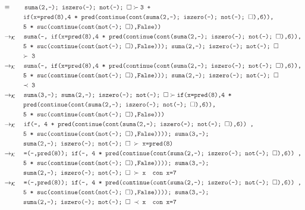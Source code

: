 \documentclass{article}
\newcommand{\tx}[1]{\textcolor{Black} {\texttt{#1}}}
\newcommand{\es}{$\square$}
\newcommand{\pop}[2]{ \tx{#1} \succ \tx{#2}}
\newcommand{\kr}{\rightarrow_{\mathcal{K}} \quad}
\begin{document}
\begin{enumerate}
\begin{enumerate}
\begin{align*}
			& \equiv \quad \quad \pop{suma(2,-); iszero(-); not(-); \es}{3 +}\\
			&\tx{\quad \quad \quad if(x=pred(8),4 * pred(continue(cont(suma(2,-); iszero(-); not(-); \es),6)),}\\
			&\tx{\quad \quad \quad 5 * suc(continue(cont(not(-); \es),False))}\\
			& \kr \tx{suma(-, if(x=pred(8),4 * pred(continue(cont(suma(2,-); iszero(-); not(-); \es),6)),}\\
			&\tx{\quad \quad \quad5 * suc(continue(cont(not(-); \es),False))); suma(2,-); iszero(-); not(-); \es}\\
			&\tx{\quad \quad \quad $\succ$ 3}\\
			& \kr \tx{suma(-, if(x=pred(8),4 * pred(continue(cont(suma(2,-); iszero(-); not(-); \es),6)),}\\
			&\tx{\quad \quad \quad 5 * suc(continue(cont(not(-); \es),False))); suma(2,-); iszero(-); not(-); \es}\\
			&\tx{\quad \quad \quad $\prec$ 3}\\
			&\kr \pop{suma(3,-); suma(2,-); iszero(-); not(-); \es}{if(x=pred(8),4 *}\\
			&\tx{\quad \quad \quad pred(continue(cont(suma(2,-); iszero(-); not(-); \es),6)),}\\
			&\tx{\quad \quad \quad 5 * suc(continue(cont(not(-); \es),False)))}\\
			&\kr \tx{if(-, 4 * pred(continue(cont(suma(2,-); iszero(-); not(-); \es),6)) ,}\\
			&\tx {\quad \quad \quad 5 * suc(continue(cont(not(-); \es),False)))); suma(3,-);}\\
			&\tx{\quad \quad \quad suma(2,-); iszero(-); not(-); \es $\ \succ $ x=pred(8)}\\
			&\kr \tx{=(-,pred(8)); if(-, 4 * pred(continue(cont(suma(2,-); iszero(-); not(-); \es),6)) ,}\\
			&\tx {\quad \quad \quad 5 * suc(continue(cont(not(-); \es),False)))); suma(3,-);}\\
			&\tx{\quad \quad \quad suma(2,-); iszero(-); not(-); \es $\ \succ $ x} \tx{\quad con x=7}\\	
			&\kr \tx{=(-,pred(8)); if(-, 4 * pred(continue(cont(suma(2,-); iszero(-); not(-); \es),6)) ,}\\
			&\tx {\quad \quad \quad 5 * suc(continue(cont(not(-); \es),False)))); suma(3,-);}\\
			&\tx{\quad \quad \quad suma(2,-); iszero(-); not(-); \es $\ \prec $ x} \tx{\quad con x=7}\\	

\end{align*}
\end{enumerate}
\end{enumerate}
\end{document}
